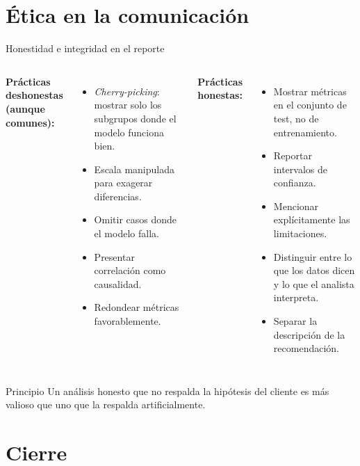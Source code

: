 \documentclass[aspectratio=169]{beamer}
\begin{document}
\section{Ética en la comunicación}

\begin{frame}{Honestidad e integridad en el reporte}
  \begin{columns}
      \textbf{Prácticas deshonestas (aunque comunes):}
      \begin{itemize}
        \item \textit{Cherry-picking}: mostrar solo los subgrupos donde el modelo funciona bien.
        \item Escala manipulada para exagerar diferencias.
        \item Omitir casos donde el modelo falla.
        \item Presentar correlación como causalidad.
        \item Redondear métricas favorablemente.
      \end{itemize}
      \textbf{Prácticas honestas:}
      \begin{itemize}
        \item Mostrar métricas en el conjunto de test, no de entrenamiento.
        \item Reportar intervalos de confianza.
        \item Mencionar explícitamente las limitaciones.
        \item Distinguir entre lo que los datos dicen y lo que el analista interpreta.
        \item Separar la descripción de la recomendación.
      \end{itemize}
  \end{columns}

  \bigskip
  \begin{alertblock}{Principio}
    Un análisis honesto que no respalda la hipótesis del cliente es más valioso que uno que la respalda artificialmente.
  \end{alertblock}
\end{frame}

\section{Cierre}
\end{document}
